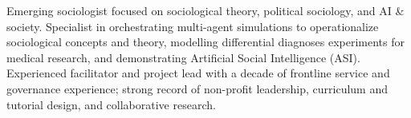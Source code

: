 Emerging sociologist focused on sociological theory, political sociology, and AI \& society. Specialist in orchestrating multi-agent simulations to operationalize sociological concepts and theory, modelling differential diagnoses experiments for medical research, and demonstrating Artificial Social Intelligence (ASI). Experienced facilitator and project lead with a decade of frontline service and governance experience; strong record of non-profit leadership, curriculum and tutorial design, and collaborative research.


